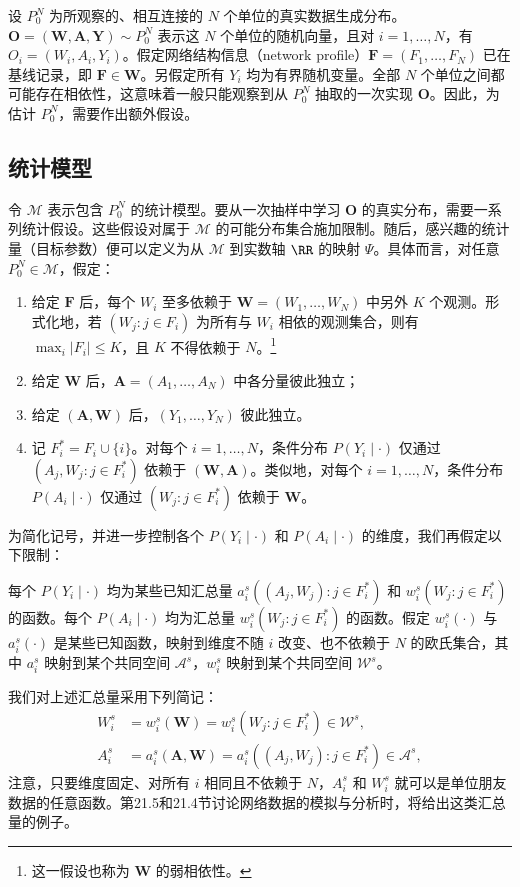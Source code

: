 设 $P_0^N$ 为所观察的、相互连接的 $N$ 个单位的真实数据生成分布。$\bm O=(\bm W,\bm A,\bm Y)\sim P_0^N$ 表示这 $N$ 个单位的随机向量，且对 $i=1,\ldots,N$，有 $O_i=(W_i,A_i,Y_i)$。假定网络结构信息（network profile）$\bm F=(F_1,\ldots,F_N)$ 已在基线记录，即 $\bm F\in\bm W$。另假定所有 $Y_i$ 均为有界随机变量。全部 $N$ 个单位之间都可能存在相依性，这意味着一般只能观察到从 $P_0^N$ 抽取的一次实现 $\bm O$。因此，为估计 $P_0^N$，需要作出额外假设。

\subsection{统计模型}

令 $\mathcal M$ 表示包含 $P_0^N$ 的统计模型。要从一次抽样中学习 $\bm O$ 的真实分布，需要一系列统计假设。这些假设对属于 $\mathcal M$ 的可能分布集合施加限制。随后，感兴趣的统计量（目标参数）便可以定义为从 $\mathcal M$ 到实数轴 $\RR$ 的映射 $\Psi$。具体而言，对任意 $P_0^N\in\mathcal M$，假定：
\begin{enumerate}[label=\textbf{A\arabic*.},leftmargin=2.8em]
\item 给定 $\bm F$ 后，每个 $W_i$ 至多依赖于 $\bm W=(W_1,\ldots,W_N)$ 中另外 $K$ 个观测。形式化地，若 $(W_j:j\in F_i)$ 为所有与 $W_i$ 相依的观测集合，则有 $\max_i|F_i|\le K$，且 $K$ 不得依赖于 $N$。\footnote{这一假设也称为 $\bm W$ 的弱相依性。}
\item 给定 $\bm W$ 后，$\bm A=(A_1,\ldots,A_N)$ 中各分量彼此独立；
\item 给定 $(\bm A,\bm W)$ 后，$(Y_1,\ldots,Y_N)$ 彼此独立。
\item 记 $F_i^*=F_i\cup\{i\}$。对每个 $i=1,\ldots,N$，条件分布 $P(Y_i\mid\cdot)$ 仅通过 $(A_j,W_j:j\in F_i^*)$ 依赖于 $(\bm W,\bm A)$。类似地，对每个 $i=1,\ldots,N$，条件分布 $P(A_i\mid\cdot)$ 仅通过 $(W_j:j\in F_i^*)$ 依赖于 $\bm W$。
\end{enumerate}

为简化记号，并进一步控制各个 $P(Y_i\mid\cdot)$ 和 $P(A_i\mid\cdot)$ 的维度，我们再假定以下限制：
\begin{description}[leftmargin=2.8em,labelsep=.6em]
\item[B1.] 每个 $P(Y_i\mid\cdot)$ 均为某些已知汇总量 $a_i^s((A_j,W_j):j\in F_i^*)$ 和 $w_i^s(W_j:j\in F_i^*)$ 的函数。每个 $P(A_i\mid\cdot)$ 均为汇总量 $w_i^s(W_j:j\in F_i^*)$ 的函数。假定 $w_i^s(\cdot)$ 与 $a_i^s(\cdot)$ 是某些已知函数，映射到维度不随 $i$ 改变、也不依赖于 $N$ 的欧氏集合，其中 $a_i^s$ 映射到某个共同空间 $\mathcal A^s$，$w_i^s$ 映射到某个共同空间 $\mathcal W^s$。
\end{description}
我们对上述汇总量采用下列简记：
\begin{equation}
 \begin{aligned}
 W_i^s&=w_i^s(\bm W)=w_i^s(W_j:j\in F_i^*)\in\mathcal W^s,\\
 A_i^s&=a_i^s(\bm A,\bm W)=a_i^s((A_j,W_j):j\in F_i^*)\in\mathcal A^s,
 \end{aligned}
 \tag{21.1}
\end{equation}
注意，只要维度固定、对所有 $i$ 相同且不依赖于 $N$，$A_i^s$ 和 $W_i^s$ 就可以是单位朋友数据的任意函数。第21.5和21.4节讨论网络数据的模拟与分析时，将给出这类汇总量的例子。


